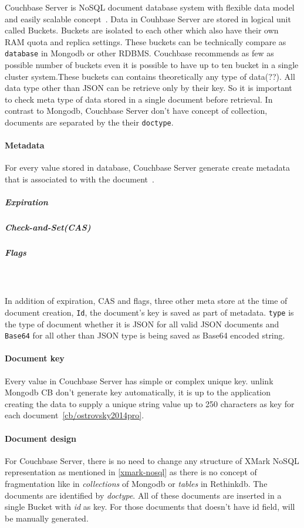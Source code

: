 Couchbase Server is NoSQL document database system with flexible data model and easily scalable concept~\cite{cb/brown2013developing}. Data in Couhbase Server are stored in logical unit called Buckets. Buckets are isolated to each other which also have their own RAM quota and replica settings. These buckets can be technically compare as \texttt{database} in Mongodb or other RDBMS. Couchbase recommends as few as possible number of buckets even it is possible to have up to ten bucket in a single cluster system.These buckets can contains theoretically any type of data(??). All data type other than JSON can be retrieve only by their key. So it is important to check meta type of data stored in a single document before retrieval. 
In contrast to Mongodb, Couchbase Server don't have concept of collection, documents are separated by the their \texttt{doctype}.
\paragraph{Metadata}
For every value stored in database, Couchbase Server generate create metadata that is associated to with the document~\cite{cb/ostrovsky2014pro}. 
	\subparagraph{Expiration}
	\subparagraph{Check-and-Set(CAS)}
	\subparagraph{Flags} 
	\\ 
	\\
In addition of expiration, CAS and flags, three other meta store at the time of document creation, \texttt{Id}, the document's key is saved as part of metadata. \texttt{type} is the type of document whether it is JSON for all valid JSON documents and \texttt{Base64} for all other than JSON type is being saved as Base64 encoded string.
\paragraph{Document key}
Every value in Couchbase Server has simple or complex   unique key. unlink Mongodb CB don't generate key automatically, it is up to the application creating the data to supply a unique string value up to 250 characters as key for each document~\ref{cb/ostrovsky2014pro}.
\paragraph{Document design}
For Couchbase Server, there is no need to change any structure of XMark NoSQL representation as mentioned in \ref{xmark-nosql} as there is no concept of fragmentation like in \textit{collections} of Mongodb or \textit{tables} in Rethinkdb. The documents are identified by \textit{doctype}. All of these documents are inserted in a single Bucket with \textit{id} as key. For those documents that doesn't have id field, will be manually generated.


